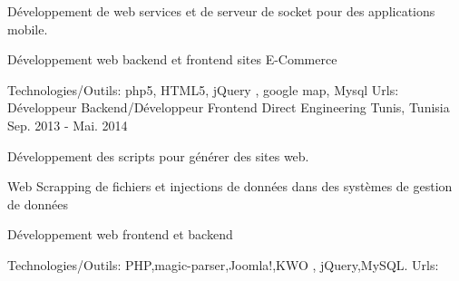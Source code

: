 \begin{cventries}
{\begin{cvitems}
        \item {Développement de web services et de serveur de socket pour des applications mobile.}
        \item {Développement web backend et frontend sites E-Commerce}
      \end{cvitems}
    }
    {\textcolor{awesome}{Technologies/Outils: } {\color{graytext}}  {php5, HTML5, jQuery , google map, Mysql}}
    {Urls:} 
    {\href{http://www.taxitasso.com/}{} \break
    \href{http://carafrika.net/}{} \break
    \href{http://darafrika.com/}{} \break    
    }       
  \techentries
    {Développeur Backend/Développeur Frontend}
    {Direct Engineering}
    {Tunis, Tunisia}
    {Sep. 2013 - Mai. 2014}
    {
      \begin{cvitems}
        \item {Développement des scripts pour générer des sites web.}
        \item {Web Scrapping de fichiers et injections de données dans des systèmes de gestion de données}
        \item {Développement web frontend et backend}
      \end{cvitems}
    }
    {\textcolor{awesome}{Technologies/Outils: } {\color{graytext}}  {PHP,magic-parser,Joomla!,KWO , jQuery,MySQL.}}
    {Urls:} 
    {\href{http://www.pure-jobs.com/}{} \break
    \href{http://www.jeveux1truc.fr/fr/}{} \break
    }       
\end{cventries}
